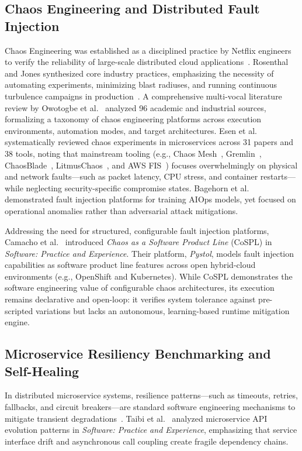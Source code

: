 \documentclass[11pt,a4paper]{article}
\begin{document}
\subsection{Chaos Engineering and Distributed Fault Injection}
Chaos Engineering was established as a disciplined practice by Netflix engineers to verify the reliability of large-scale distributed cloud applications~\cite{basiri2016chaos}. Rosenthal and Jones synthesized core industry practices, emphasizing the necessity of automating experiments, minimizing blast radiuses, and running continuous turbulence campaigns in production~\cite{rosenthal2020chaos}. A comprehensive multi-vocal literature review by Owotogbe et al.~\cite{owotogbe2025chaos} analyzed 96 academic and industrial sources, formalizing a taxonomy of chaos engineering platforms across execution environments, automation modes, and target architectures. Esen et al.~\cite{esen2025chaos} systematically reviewed chaos experiments in microservices across 31 papers and 38 tools, noting that mainstream tooling (e.g., Chaos Mesh~\cite{chaosmesh2021}, Gremlin~\cite{gremlin2022}, ChaosBlade~\cite{chaosblade2021}, LitmusChaos~\cite{litmus2022}, and AWS FIS~\cite{awsfis2023}) focuses overwhelmingly on physical and network faults—such as packet latency, CPU stress, and container restarts—while neglecting security-specific compromise states. Bagehorn et al.~\cite{baghorn2022fault} demonstrated fault injection platforms for training AIOps models, yet focused on operational anomalies rather than adversarial attack mitigations.

Addressing the need for structured, configurable fault injection platforms, Camacho et al.~\cite{camacho2022chaos} introduced \textit{Chaos as a Software Product Line} (CoSPL) in \textit{Software: Practice and Experience}. Their platform, \textit{Pystol}, models fault injection capabilities as software product line features across open hybrid-cloud environments (e.g., OpenShift and Kubernetes). While CoSPL demonstrates the software engineering value of configurable chaos architectures, its execution remains declarative and open-loop: it verifies system tolerance against pre-scripted variations but lacks an autonomous, learning-based runtime mitigation engine.

\subsection{Microservice Resiliency Benchmarking and Self-Healing}
In distributed microservice systems, resilience patterns—such as timeouts, retries, fallbacks, and circuit breakers—are standard software engineering mechanisms to mitigate transient degradations~\cite{aderaldo2025declarative, schneider2015survey, soldani2023microservice}. Taibi et al.~\cite{taibi2021microservice} analyzed microservice API evolution patterns in \textit{Software: Practice and Experience}, emphasizing that service interface drift and asynchronous call coupling create fragile dependency chains.
\end{document}
